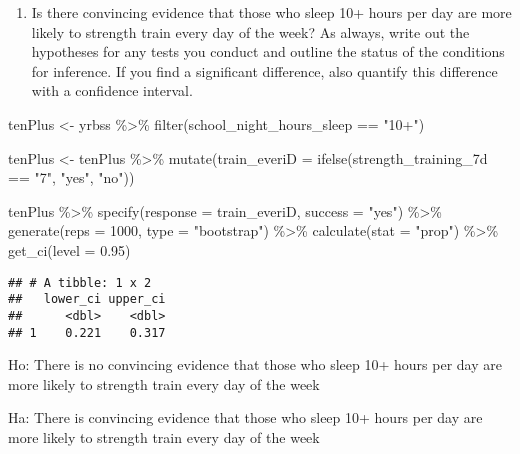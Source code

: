 \documentclass[
]{article}
\newenvironment{Shaded}{\begin{snugshade}}{\end{snugshade}}
\newcommand{\AttributeTok}[1]{\textcolor[rgb]{0.77,0.63,0.00}{#1}}
\newcommand{\DecValTok}[1]{\textcolor[rgb]{0.00,0.00,0.81}{#1}}
\newcommand{\FloatTok}[1]{\textcolor[rgb]{0.00,0.00,0.81}{#1}}
\newcommand{\FunctionTok}[1]{\textcolor[rgb]{0.00,0.00,0.00}{#1}}
\newcommand{\NormalTok}[1]{#1}
\newcommand{\OtherTok}[1]{\textcolor[rgb]{0.56,0.35,0.01}{#1}}
\newcommand{\SpecialCharTok}[1]{\textcolor[rgb]{0.00,0.00,0.00}{#1}}
\newcommand{\StringTok}[1]{\textcolor[rgb]{0.31,0.60,0.02}{#1}}
\providecommand{\tightlist}{%
  \setlength{\itemsep}{0pt}\setlength{\parskip}{0pt}}
\begin{document}
\begin{enumerate}
\def\labelenumi{\arabic{enumi}.}
\setcounter{enumi}{8}
\tightlist
\item
  Is there convincing evidence that those who sleep 10+ hours per day
  are more likely to strength train every day of the week? As always,
  write out the hypotheses for any tests you conduct and outline the
  status of the conditions for inference. If you find a significant
  difference, also quantify this difference with a confidence interval.
\end{enumerate}

\begin{Shaded}
\begin{Highlighting}[]
\NormalTok{tenPlus }\OtherTok{\textless{}{-}}\NormalTok{ yrbss  }\SpecialCharTok{\%\textgreater{}\%}
  \FunctionTok{filter}\NormalTok{(school\_night\_hours\_sleep }\SpecialCharTok{==} \StringTok{"10+"}\NormalTok{)}

\NormalTok{tenPlus }\OtherTok{\textless{}{-}}\NormalTok{ tenPlus }\SpecialCharTok{\%\textgreater{}\%}
  \FunctionTok{mutate}\NormalTok{(}\AttributeTok{train\_everiD =} \FunctionTok{ifelse}\NormalTok{(strength\_training\_7d }\SpecialCharTok{==} \StringTok{"7"}\NormalTok{, }\StringTok{"yes"}\NormalTok{, }\StringTok{"no"}\NormalTok{))}

\NormalTok{tenPlus }\SpecialCharTok{\%\textgreater{}\%}
  \FunctionTok{specify}\NormalTok{(}\AttributeTok{response =}\NormalTok{ train\_everiD, }\AttributeTok{success =} \StringTok{"yes"}\NormalTok{) }\SpecialCharTok{\%\textgreater{}\%}
  \FunctionTok{generate}\NormalTok{(}\AttributeTok{reps =} \DecValTok{1000}\NormalTok{, }\AttributeTok{type =} \StringTok{"bootstrap"}\NormalTok{) }\SpecialCharTok{\%\textgreater{}\%}
  \FunctionTok{calculate}\NormalTok{(}\AttributeTok{stat =} \StringTok{"prop"}\NormalTok{) }\SpecialCharTok{\%\textgreater{}\%}
  \FunctionTok{get\_ci}\NormalTok{(}\AttributeTok{level =} \FloatTok{0.95}\NormalTok{)}
\end{Highlighting}
\end{Shaded}

\begin{verbatim}
## # A tibble: 1 x 2
##   lower_ci upper_ci
##      <dbl>    <dbl>
## 1    0.221    0.317
\end{verbatim}

Ho: There is no convincing evidence that those who sleep 10+ hours per
day are more likely to strength train every day of the week

Ha: There is convincing evidence that those who sleep 10+ hours per day
are more likely to strength train every day of the week
\end{document}
